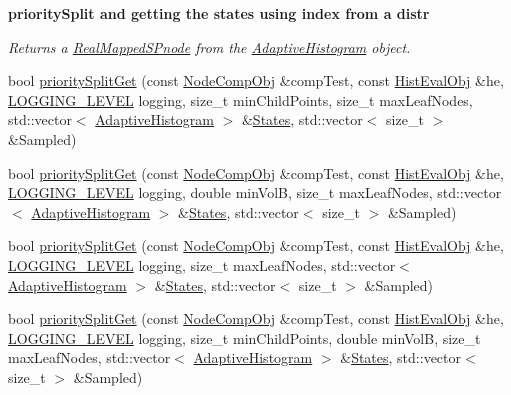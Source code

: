 \begin{Indent}{\bf priority\-Split and getting the states using index from a distr}\par
{\em \-Returns a \hyperlink{classsubpavings_1_1RealMappedSPnode}{\-Real\-Mapped\-S\-Pnode} from the \hyperlink{classsubpavings_1_1AdaptiveHistogram}{\-Adaptive\-Histogram} object. }\begin{DoxyCompactItemize}
\item 
bool \hyperlink{classsubpavings_1_1AdaptiveHistogram_a1dffa971cfc56ec37449ce285a596365}{priority\-Split\-Get} (const \hyperlink{classsubpavings_1_1NodeCompObj}{\-Node\-Comp\-Obj} \&comp\-Test, const \hyperlink{classsubpavings_1_1HistEvalObj}{\-Hist\-Eval\-Obj} \&he, \hyperlink{namespacesubpavings_aef8e51096b59ecaf1a1e9b2ee24b6089}{\-L\-O\-G\-G\-I\-N\-G\-\_\-\-L\-E\-V\-E\-L} logging, size\-\_\-t min\-Child\-Points, size\-\_\-t max\-Leaf\-Nodes, std\-::vector$<$ \hyperlink{classsubpavings_1_1AdaptiveHistogram}{\-Adaptive\-Histogram} $>$ \&\hyperlink{CatalanCoeff_8hpp_ac525a0f6dc3802f95ee1ea51f9be6826}{\-States}, std\-::vector$<$ size\-\_\-t $>$ \&\-Sampled)
\item 
bool \hyperlink{classsubpavings_1_1AdaptiveHistogram_ab3416e49bbb37e982e2e2f6a1ef13850}{priority\-Split\-Get} (const \hyperlink{classsubpavings_1_1NodeCompObj}{\-Node\-Comp\-Obj} \&comp\-Test, const \hyperlink{classsubpavings_1_1HistEvalObj}{\-Hist\-Eval\-Obj} \&he, \hyperlink{namespacesubpavings_aef8e51096b59ecaf1a1e9b2ee24b6089}{\-L\-O\-G\-G\-I\-N\-G\-\_\-\-L\-E\-V\-E\-L} logging, double min\-Vol\-B, size\-\_\-t max\-Leaf\-Nodes, std\-::vector$<$ \hyperlink{classsubpavings_1_1AdaptiveHistogram}{\-Adaptive\-Histogram} $>$ \&\hyperlink{CatalanCoeff_8hpp_ac525a0f6dc3802f95ee1ea51f9be6826}{\-States}, std\-::vector$<$ size\-\_\-t $>$ \&\-Sampled)
\item 
bool \hyperlink{classsubpavings_1_1AdaptiveHistogram_a3eab9e09fee0aa81bd19bf170cf23aea}{priority\-Split\-Get} (const \hyperlink{classsubpavings_1_1NodeCompObj}{\-Node\-Comp\-Obj} \&comp\-Test, const \hyperlink{classsubpavings_1_1HistEvalObj}{\-Hist\-Eval\-Obj} \&he, \hyperlink{namespacesubpavings_aef8e51096b59ecaf1a1e9b2ee24b6089}{\-L\-O\-G\-G\-I\-N\-G\-\_\-\-L\-E\-V\-E\-L} logging, size\-\_\-t max\-Leaf\-Nodes, std\-::vector$<$ \hyperlink{classsubpavings_1_1AdaptiveHistogram}{\-Adaptive\-Histogram} $>$ \&\hyperlink{CatalanCoeff_8hpp_ac525a0f6dc3802f95ee1ea51f9be6826}{\-States}, std\-::vector$<$ size\-\_\-t $>$ \&\-Sampled)
\item 
bool \hyperlink{classsubpavings_1_1AdaptiveHistogram_afee0931f38335b1d797680a0c9b6cfe5}{priority\-Split\-Get} (const \hyperlink{classsubpavings_1_1NodeCompObj}{\-Node\-Comp\-Obj} \&comp\-Test, const \hyperlink{classsubpavings_1_1HistEvalObj}{\-Hist\-Eval\-Obj} \&he, \hyperlink{namespacesubpavings_aef8e51096b59ecaf1a1e9b2ee24b6089}{\-L\-O\-G\-G\-I\-N\-G\-\_\-\-L\-E\-V\-E\-L} logging, size\-\_\-t min\-Child\-Points, double min\-Vol\-B, size\-\_\-t max\-Leaf\-Nodes, std\-::vector$<$ \hyperlink{classsubpavings_1_1AdaptiveHistogram}{\-Adaptive\-Histogram} $>$ \&\hyperlink{CatalanCoeff_8hpp_ac525a0f6dc3802f95ee1ea51f9be6826}{\-States}, std\-::vector$<$ size\-\_\-t $>$ \&\-Sampled)

\end{DoxyCompactItemize}
\end{Indent}
